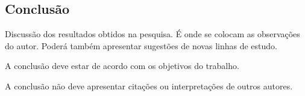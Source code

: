 \subsection{\esp Conclusão}

Discussão dos resultados obtidos na pesquisa. É onde se colocam as observações do autor. 
Poderá também apresentar sugestões de novas linhas de estudo.

A conclusão deve estar de acordo com os objetivos do trabalho.

A conclusão não deve apresentar citações ou interpretações de outros autores.
